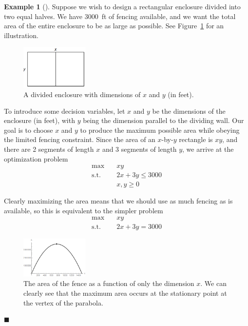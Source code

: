 \documentclass[11pt]{article}
\theoremstyle{definition} %
\newtheorem{ex}{Example}[section] %
\newenvironment{example}[1][]{\begin{ex}[#1]}{\hfill$\blacksquare$\end{ex}} %
\begin{document}
\begin{example}
\label{ex:calculus}
	Suppose we wish to design a rectangular enclosure divided into two equal halves. We have 3000~ft of fencing available, and we want the total area of the entire enclosure to be as large as possible. See Figure~\ref{fig:fence} for an illustration.
	
	\begin{figure}[h]
		\centering
		\includegraphics[width=0.3\textwidth]{figures/fence.png}
		\caption{A divided enclosure with dimensions of $x$ and $y$ (in feet).}
		\label{fig:fence}
	\end{figure}
	
	To introduce some decision variables, let $x$ and $y$ be the dimensions of the enclosure (in feet), with $y$ being the dimension parallel to the dividing wall. Our goal is to choose $x$ and $y$ to produce the maximum possible area while obeying the limited fencing constraint. Since the area of an $x$-by-$y$ rectangle is $xy$, and there are 2 segments of length $x$ and 3 segments of length $y$, we arrive at the optimization problem
	\begin{align*}
		\max \quad& xy \\
		\mathrm{s.t.} \quad& 2x + 3y \le 3000 \\
		& x,y \ge 0
	\end{align*}
	
	Clearly maximizing the area means that we should use as much fencing as is available, so this is equivalent to the simpler problem
	\begin{align*}
		\max \quad& xy \\
		\mathrm{s.t.} \quad& 2x + 3y = 3000
	\end{align*}
	
	\begin{figure}[h]
		\centering
		\includegraphics[width=0.3\textwidth]{figures/fence_calc1.png}
		\caption{The area of the fence as a function of only the dimension $x$. We can clearly see that the maximum area occurs at the stationary point at the vertex of the parabola.}
		\label{fig:fenceopt1}
	\end{figure}
	

\end{example}
\end{document}
